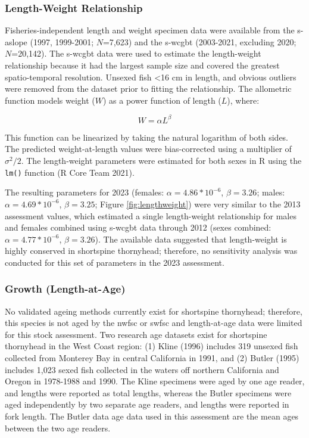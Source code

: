 \documentclass[11pt,
  english,
  letterpaper,
]{article}
\begin{document}
\hypertarget{length-weight-relationship}{%
\subsubsection{Length-Weight Relationship}\label{length-weight-relationship}}

Fisheries-independent length and weight specimen data were available from the \gls{s-aslope} (1997, 1999-2001; \(N\)=7,623) and the \gls{s-wcgbt} (2003-2021, excluding 2020; \(N\)=20,142). The \gls{s-wcgbt} data were used to estimate the length-weight relationship because it had the largest sample size and covered the greatest spatio-temporal resolution. Unsexed fish \textless16 cm in length, and obvious outliers were removed from the dataset prior to fitting the relationship. The allometric function models weight (\(W\)) as a power function of length (\(L\)), where:

\begin{equation} W = \alpha L^{\beta} \end{equation}

This function can be linearized by taking the natural logarithm of both sides. The predicted weight-at-length values were bias-corrected using a multiplier of \(\sigma^2 / 2\). The length-weight parameters were estimated for both sexes in R using the \texttt{lm()} function (R Core Team 2021).

The resulting parameters for 2023 (females: \(\alpha = 4.86*10^{-6}\), \(\beta = 3.26\); males: \(\alpha = 4.69*10^{-6}\), \(\beta = 3.25\); Figure \ref{fig:lengthweight}) were very similar to the 2013 assessment values, which estimated a single length-weight relationship for males and females combined using \gls{s-wcgbt} data through 2012 (sexes combined: \(\alpha = 4.77*10^{-6}\), \(\beta=3.26\)). The available data suggested that length-weight is highly conserved in shortspine thornyhead; therefore, no sensitivity analysis was conducted for this set of parameters in the 2023 assessment.

\hypertarget{growth-length-at-age}{%
\subsubsection{Growth (Length-at-Age)}\label{growth-length-at-age}}

No validated ageing methods currently exist for shortspine thornyhead; therefore, this species is not aged by the \gls{nwfsc} or \gls{swfsc} and length-at-age data were limited for this stock assessment. Two research age datasets exist for shortspine thornyhead in the West Coast region: (1) Kline (1996) includes 319 unsexed fish collected from Monterey Bay in central California in 1991, and (2) Butler (1995) includes 1,023 sexed fish collected in the waters off northern California and Oregon in 1978-1988 and 1990. The Kline specimens were aged by one age reader, and lengths were reported as total lengths, whereas the Butler specimens were aged independently by two separate age readers, and lengths were reported in fork length. The Butler data age data used in this assessment are the mean ages between the two age readers.
\end{document}
